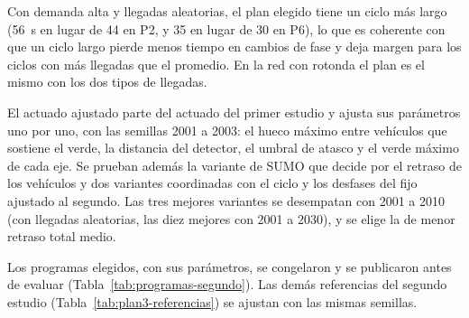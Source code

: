 Con demanda alta y llegadas aleatorias, el plan elegido tiene un ciclo
más largo (56~s en lugar de 44 en P2, y 35 en lugar de 30 en P6), lo
que es coherente con que un ciclo largo pierde menos tiempo en cambios
de fase y deja margen para los ciclos con más llegadas que el promedio.
En la red con rotonda el plan es el mismo con los dos tipos de
llegadas.

El actuado ajustado parte del actuado del primer estudio y ajusta sus
parámetros uno por uno, con las semillas 2001 a 2003: el hueco máximo
entre vehículos que sostiene el verde, la distancia del detector, el
umbral de atasco y el verde máximo de cada eje. Se prueban además la
variante de SUMO que decide por el retraso de los vehículos y dos
variantes coordinadas con el ciclo y los desfases del fijo ajustado al
segundo. Las tres mejores variantes se desempatan con 2001 a 2010 (con
llegadas aleatorias, las diez mejores con 2001 a 2030), y se elige la
de menor retraso total medio.

Los programas elegidos, con sus parámetros, se congelaron y se
publicaron antes de evaluar (Tabla~\ref{tab:programas-segundo}).
Las demás referencias del segundo estudio
(Tabla~\ref{tab:plan3-referencias}) se ajustan con las mismas semillas.

